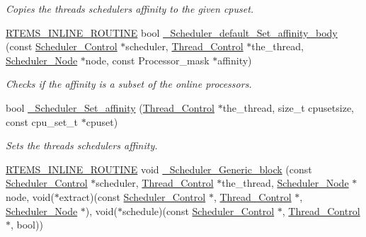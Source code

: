 \begin{DoxyCompactItemize}
\begin{DoxyCompactList}\small\item\em Copies the thread\textquotesingle{}s scheduler\textquotesingle{}s affinity to the given cpuset. \end{DoxyCompactList}\item 
\mbox{\hyperlink{group__RTEMSScoreBaseDefs_gac216239df231d5dbd15e3520b0b9313f}{R\+T\+E\+M\+S\+\_\+\+I\+N\+L\+I\+N\+E\+\_\+\+R\+O\+U\+T\+I\+NE}} bool \mbox{\hyperlink{group__RTEMSScoreScheduler_ga2c102abed212353a605a1dd7f483e211}{\+\_\+\+Scheduler\+\_\+default\+\_\+\+Set\+\_\+affinity\+\_\+body}} (const \mbox{\hyperlink{struct__Scheduler__Control}{Scheduler\+\_\+\+Control}} $\ast$scheduler, \mbox{\hyperlink{struct__Thread__Control}{Thread\+\_\+\+Control}} $\ast$the\+\_\+thread, \mbox{\hyperlink{structScheduler__Node}{Scheduler\+\_\+\+Node}} $\ast$node, const Processor\+\_\+mask $\ast$affinity)
\begin{DoxyCompactList}\small\item\em Checks if the affinity is a subset of the online processors. \end{DoxyCompactList}\item 
bool \mbox{\hyperlink{group__RTEMSScoreScheduler_gacdfe46e00fd7c565e7a93f62c88fd968}{\+\_\+\+Scheduler\+\_\+\+Set\+\_\+affinity}} (\mbox{\hyperlink{struct__Thread__Control}{Thread\+\_\+\+Control}} $\ast$the\+\_\+thread, size\+\_\+t cpusetsize, const cpu\+\_\+set\+\_\+t $\ast$cpuset)
\begin{DoxyCompactList}\small\item\em Sets the thread\textquotesingle{}s scheduler\textquotesingle{}s affinity. \end{DoxyCompactList}\item 
\mbox{\hyperlink{group__RTEMSScoreBaseDefs_gac216239df231d5dbd15e3520b0b9313f}{R\+T\+E\+M\+S\+\_\+\+I\+N\+L\+I\+N\+E\+\_\+\+R\+O\+U\+T\+I\+NE}} void \mbox{\hyperlink{group__RTEMSScoreScheduler_ga582a9364e4794778595d769e3f4f4693}{\+\_\+\+Scheduler\+\_\+\+Generic\+\_\+block}} (const \mbox{\hyperlink{struct__Scheduler__Control}{Scheduler\+\_\+\+Control}} $\ast$scheduler, \mbox{\hyperlink{struct__Thread__Control}{Thread\+\_\+\+Control}} $\ast$the\+\_\+thread, \mbox{\hyperlink{structScheduler__Node}{Scheduler\+\_\+\+Node}} $\ast$node, void($\ast$extract)(const \mbox{\hyperlink{struct__Scheduler__Control}{Scheduler\+\_\+\+Control}} $\ast$, \mbox{\hyperlink{struct__Thread__Control}{Thread\+\_\+\+Control}} $\ast$, \mbox{\hyperlink{structScheduler__Node}{Scheduler\+\_\+\+Node}} $\ast$), void($\ast$schedule)(const \mbox{\hyperlink{struct__Scheduler__Control}{Scheduler\+\_\+\+Control}} $\ast$, \mbox{\hyperlink{struct__Thread__Control}{Thread\+\_\+\+Control}} $\ast$, bool))

\end{DoxyCompactItemize}
